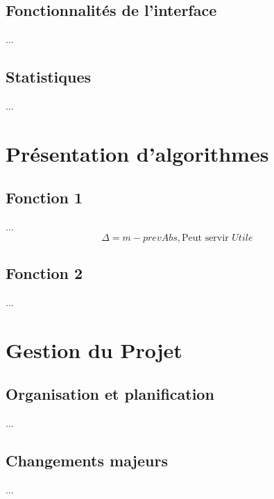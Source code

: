 \documentclass[twoside]{report}
\begin{document}
\newpage

\section{Fonctionnalités de l'interface}
...

\newpage
\section{Statistiques} %
...


\chapter{Présentation d'algorithmes}
\section{Fonction 1}
...
\[\Delta = m - prevAbs, \text{Peut servir $Utile$ }\]

\newpage
\section{Fonction 2}
...

\chapter{Gestion du Projet}
\section{Organisation et planification}
...

\newpage
\section{Changements majeurs}
...

\newpage
\thispagestyle{empty}
\end{document}
